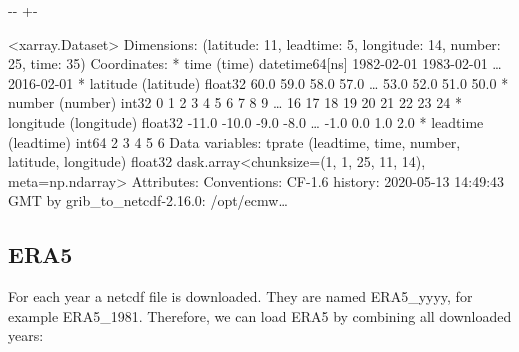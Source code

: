 \documentclass[letterpaper,10pt,english]{sphinxmanual}
\newlength\nbsphinxcodecellspacing
\begin{document}
{

\kern-\sphinxverbatimsmallskipamount\kern-\baselineskip
\kern+\FrameHeightAdjust\kern-\fboxrule
\vspace{\nbsphinxcodecellspacing}

\begin{sphinxVerbatim}[commandchars=\\\{\}]
\llap{\color{nbsphinxout}[11]:\,\hspace{\fboxrule}\hspace{\fboxsep}}<xarray.Dataset>
Dimensions:    (latitude: 11, leadtime: 5, longitude: 14, number: 25, time: 35)
Coordinates:
  * time       (time) datetime64[ns] 1982-02-01 1983-02-01 {\ldots} 2016-02-01
  * latitude   (latitude) float32 60.0 59.0 58.0 57.0 {\ldots} 53.0 52.0 51.0 50.0
  * number     (number) int32 0 1 2 3 4 5 6 7 8 9 {\ldots} 16 17 18 19 20 21 22 23 24
  * longitude  (longitude) float32 -11.0 -10.0 -9.0 -8.0 {\ldots} -1.0 0.0 1.0 2.0
  * leadtime   (leadtime) int64 2 3 4 5 6
Data variables:
    tprate     (leadtime, time, number, latitude, longitude) float32 dask.array<chunksize=(1, 1, 25, 11, 14), meta=np.ndarray>
Attributes:
    Conventions:  CF-1.6
    history:      2020-05-13 14:49:43 GMT by grib\_to\_netcdf-2.16.0: /opt/ecmw{\ldots}
\end{sphinxVerbatim}
}


\subsection{ERA5}
\label{\detokenize{Notebooks/2.Preprocess/2.Preprocess:ERA5}}
For each year a netcdf file is downloaded. They are named ERA5\_yyyy, for example ERA5\_1981. Therefore, we can load ERA5 by combining all downloaded years:

{
\begin{sphinxVerbatim}[commandchars=\\\{\}]
\llap{\color{nbsphinxin}[12]:\,\hspace{\fboxrule}\hspace{\fboxsep}}   
\end{sphinxVerbatim}
}
\end{document}
